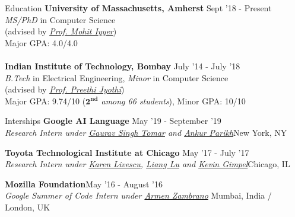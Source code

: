 \documentclass{resume} %
\begin{document}
\begin{rSection}{Education}
\vspace*{0.1in}
{\bf University of Massachusetts, Amherst} \hfill {Sept '18 - Present} \\ \textit{MS/PhD} in Computer Science \\ (advised by \textit{\href{https://people.cs.umass.edu/~miyyer/}{Prof. Mohit Iyyer}}) \\
Major GPA: 4.0/4.0\\\\
{\bf Indian Institute of Technology, Bombay} \hfill {July '14 - July '18} \\ 
\textit{B.Tech} in Electrical Engineering, \textit{Minor} in Computer Science\\
(advised by \textit{\href{https://www.cse.iitb.ac.in/~pjyothi/}{Prof. Preethi Jyothi}})\\
Major GPA: 9.74/10 (\textit{$\mathbf{2^{nd}}$ among 66 students}), Minor GPA: 10/10
\end{rSection}

\begin{rSection}{Interships}
\vspace*{0.1in}
{\bf Google AI Language}{ \hfill May '19 - September '19}\\ \textit{Research Intern under \href{https://ai.google/research/people/GauravSinghTomar/}{Gaurav Singh Tomar} and \href{www.ankurparikh.com}{Ankur Parikh}}{\hfill New York, NY}

{\bf Toyota Technological Institute at Chicago}{ \hfill May '17 - July '17}\\ \textit{Research Intern under \href{http://ttic.uchicago.edu/~klivescu/}{Karen Livescu}, \href{http://ttic.uchicago.edu/~llu/}{Liang Lu} and \href{http://ttic.uchicago.edu/~kgimpel/}{Kevin Gimpel}}{\hfill Chicago, IL}

{\bf Mozilla Foundation}{\hfill May '16 - August '16} \\ \textit{Google Summer of Code Intern under \href{https://github.com/armenzg}{Armen Zambrano}}{ \hfill Mumbai, India / London, UK}
\end{rSection}
\end{document}
